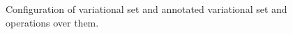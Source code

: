 \begin{figure}
%
%
%


\caption{Configuration of variational set and annotated variational set and operations over them.
}
\label{fig:vset}
\end{figure}

